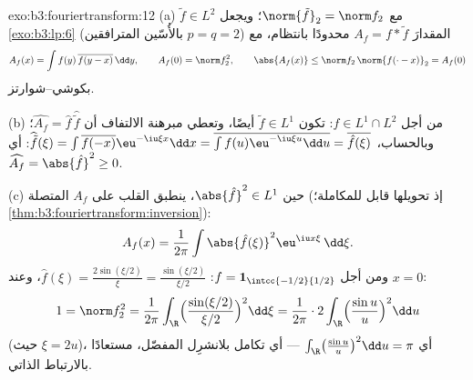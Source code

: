 \begin{solution}{exo:b3:fouriertransform:12}
(a) $\tilde f \in L^2$ مع $\norm{\tilde f}_2 = \norm f_2$؛ ويجعل \cref{exo:b3:lp:6} (بالأُسّين المترافقين
$p = q = 2$) المقدارَ $A_f = f * \tilde f$ محدودًا  بانتظام، مع
\[
A_f(x) = \int f(y)\,\overline{f(y - x)}\,\dd y,
\qquad A_f(0) = \norm f_2^2,
\qquad \abs{A_f(x)} \leq \norm f_2\,\norm{f(\cdot -
x)}_2 = A_f(0)
\]
بكوشي--شوارتز.

(b) من أجل $f \in L^1\cap L^2$: تكون $\tilde f \in L^1$ أيضًا، وتعطي مبرهنة الالتفاف
أن $\widehat{A_f} = \hat f\,
\widehat{\tilde f}$؛ وبالحساب، $\widehat{\tilde f}(\xi) =
\int\overline{f(-x)}\eu^{-\iu\xi x}\dd x =
\overline{\int f(u)\eu^{-\iu\xi u}\dd u} =
\overline{\hat f(\xi)}$: أي $\widehat{A_f} = \abs{\hat f}^2
\geq 0$.

(c) حين $\abs{\hat f}^2 \in L^1$، ينطبق القلب على $A_f$ المتصلة (إذ تحويلها
قابل للمكاملة؛ \cref{thm:b3:fouriertransform:inversion}):
\[
A_f(x) = \frac1{2\pi}\int\abs{\hat f(\xi)}^2
\eu^{\iu x\xi}\,\dd\xi .
\]
ومن أجل $f = \mathbf 1_{\intcc{-1/2}{1/2}}$: $\hat f(\xi) =
\frac{2\sin(\xi/2)}\xi = \frac{\sin(\xi/2)}{\xi/2}$، وعند $x = 0$:
\[
1 = \norm f_2^2 = \frac1{2\pi}\int_\R
\Bigl(\frac{\sin(\xi/2)}{\xi/2}\Bigr)^2\dd\xi
= \frac1{2\pi}\cdot2\int_\R\Bigl(\frac{\sin u}u\Bigr)^2\dd u
\]
(حيث $\xi = 2u$)، أي $\int_\R\bigl(\frac{\sin u}u\bigr)^2\dd
u = \pi$ --- أي تكامل بلانشرِل المفضّل،
مستعادًا بالارتباط الذاتي.
\end{solution}

